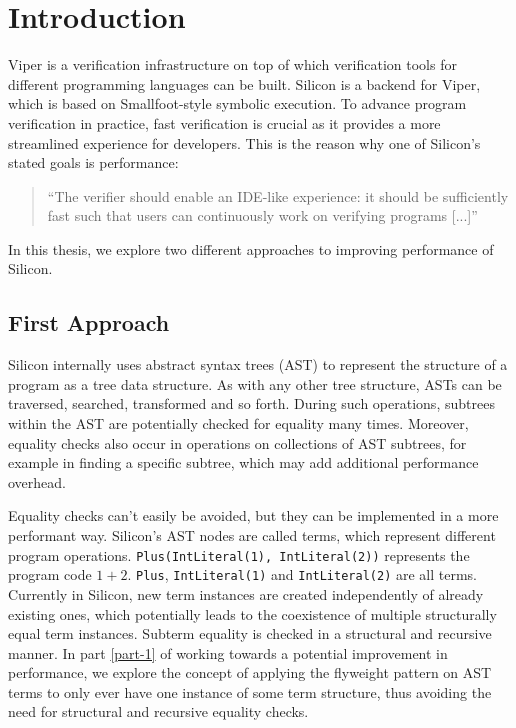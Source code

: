\documentclass[11pt]{article}
\begin{document}
    \setcounter{tocdepth}{2}
    \tableofcontents
    \newpage


    \section{Introduction}

    Viper \cite{viper} is a verification infrastructure on top of which verification tools
    for different programming languages can be built. Silicon \cite{silicon} is a backend for Viper,
    which is based on Smallfoot-style \cite{smallfoot} symbolic execution. 
    To advance program verification in practice,
    fast verification is crucial as it provides a more streamlined experience for developers.
    This is the reason why one of Silicon's stated goals is performance:

    \begin{quote} 
        ``The verifier should enable an IDE-like experience: it should be
        sufficiently fast such that users can continuously work on verifying
        programs [...]'' \cite{silicon}
    \end{quote}

    In this thesis, we explore two different approaches to improving performance of Silicon.

    \subsection*{First Approach}

    Silicon internally uses abstract syntax trees (AST) to represent
    the structure of a program as a tree data structure. As with any other tree structure,
    ASTs can be traversed, searched, transformed and so forth. During such operations,
    subtrees within the AST are potentially checked for equality many times.  Moreover, equality checks
    also occur in operations on collections of AST subtrees, for example in finding
    a specific subtree, which may add additional performance overhead.

    Equality checks can't easily be avoided, but they can be implemented in a more performant way.
    Silicon's AST nodes are called terms, which represent different program operations.
    \texttt{Plus(IntLiteral(1), IntLiteral(2))} represents the program code $1 + 2$. \texttt{Plus}, \texttt{IntLiteral(1)}
    and \texttt{IntLiteral(2)} are all terms.
    Currently in Silicon, new term instances are created independently of already existing ones, which potentially leads 
    to the coexistence of multiple structurally equal term instances. Subterm equality is checked in a
    structural and recursive manner. In part \ref{part-1} of working towards a potential improvement in performance,
    we explore the concept of applying the flyweight pattern \cite{patterns} on AST terms to only ever have
    one instance of some term structure, thus avoiding the need for structural and recursive equality checks.
\end{document}
